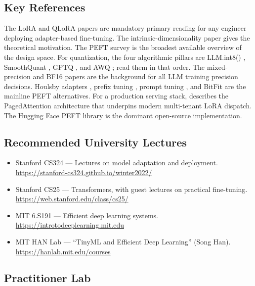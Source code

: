 \subsection{Key References}

The LoRA and QLoRA papers \citep{hu2021lora, dettmers2023qlora} are
mandatory primary reading for any engineer deploying adapter-based
fine-tuning. The intrinsic-dimensionality paper
\citep{aghajanyan2021intrinsic} gives the theoretical motivation.
The PEFT survey \citep{lialin2023peftsurvey} is the broadest
available overview of the design space.
For quantization, the four algorithmic pillars are LLM.int8()
\citep{dettmers2022llmint8}, SmoothQuant \citep{xiao2023smoothquant},
GPTQ \citep{frantar2023gptq}, and AWQ \citep{lin2024awq}; read them
in that order. The mixed-precision \citep{micikevicius2018mixed}
and BF16 \citep{kalamkar2019bfloat16} papers are the background
for all LLM training precision decisions. Houlsby adapters
\citep{houlsby2019adapters}, prefix tuning \citep{li2021prefix},
prompt tuning \citep{lester2021prompt}, and BitFit
\citep{zaken2022bitfit} are the mainline PEFT alternatives. For a
production serving stack, \citet{kwon2023vllm} describes the
PagedAttention architecture that underpins modern multi-tenant
LoRA dispatch. The Hugging Face PEFT library
\citep{mangrulkar2023peft} is the dominant open-source
implementation.

\subsection{Recommended University Lectures}

\begin{itemize}
  \item Stanford CS324 --- Lectures on model adaptation and
        deployment.  \url{https://stanford-cs324.github.io/winter2022/}
  \item Stanford CS25 --- Transformers, with guest lectures on
        practical fine-tuning.  \url{https://web.stanford.edu/class/cs25/}
  \item MIT 6.S191 --- Efficient deep learning systems.
        \url{https://introtodeeplearning.mit.edu}
  \item MIT HAN Lab --- ``TinyML and Efficient Deep Learning''
        (Song Han).  \url{https://hanlab.mit.edu/courses}
\end{itemize}

\subsection{Practitioner Lab}

